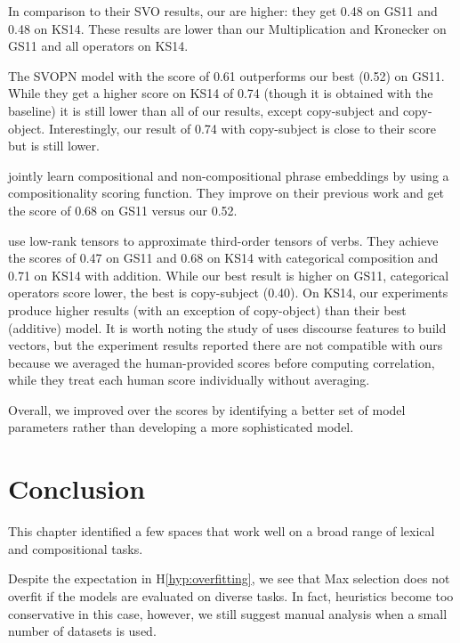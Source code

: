 In comparison to their SVO results, our are higher: they get 0.48 on GS11 and 0.48 on KS14. These results are lower than our Multiplication and Kronecker on GS11 and all operators on KS14.

The SVOPN model with the score of 0.61 outperforms our best (0.52) on GS11. While they get a higher score on KS14 of 0.74 (though it is obtained with the  baseline) it is still lower than all of our results, except copy-subject and copy-object. Interestingly, our result of 0.74 with copy-subject is close to their score but is still lower.

 jointly learn compositional and non-compositional phrase embeddings by using a compositionality scoring function. They improve on their previous work and get the score of 0.68 on GS11 versus our 0.52.

 use low-rank tensors to approximate third-order tensors of verbs. They achieve the scores of 0.47 on GS11 and 0.68 on KS14 with categorical composition and 0.71 on KS14 with addition. While our best result is higher on GS11, categorical operators score lower, the best is copy-subject (0.40). On KS14, our experiments produce higher results (with an exception of copy-object) than their best (additive) model. It is worth noting the study of  uses discourse features to build vectors, but the experiment results reported there are not compatible with ours because we averaged the human-provided scores before computing correlation, while they treat each human score individually without averaging.

Overall, we improved over the scores by identifying a better set of model parameters rather than developing a more sophisticated model.

\section{Conclusion}
\label{sec:conclusion-universal}

This chapter identified a few spaces that work well on a broad range of lexical and compositional tasks.

Despite the expectation in H\ref{hyp:overfitting}, we see that Max selection does not overfit if the models are evaluated on diverse tasks. In fact, heuristics become too conservative in this case, however, we still suggest manual analysis when a small number of datasets is used.

